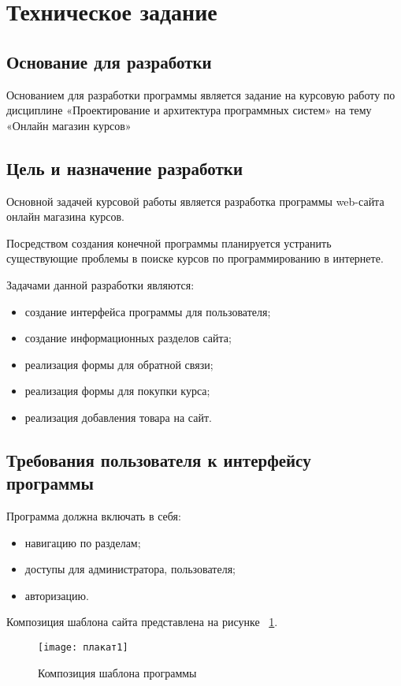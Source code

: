 \section{Техническое задание}
\subsection{Основание для разработки}

Основанием для разработки программы является задание на курсовую работу по дисциплине «Проектирование и архитектура программных систем» на тему «Онлайн магазин курсов»

\subsection{Цель и назначение разработки}

Основной задачей курсовой работы является разработка программы web-сайта онлайн магазина курсов.

Посредством создания конечной программы планируется устранить существующие проблемы в поиске курсов по программированию в интернете.

Задачами данной разработки являются:
\begin{itemize}
	\item создание интерфейса программы для пользователя;
	\item создание информационных разделов сайта;
	\item реализация формы для обратной связи;
	\item реализация формы для покупки курса;
	\item реализация добавления товара на сайт.
\end{itemize}

\subsection{Требования пользователя к интерфейсу программы}

Программа должна включать в себя:
\begin{itemize}
	\item навигацию по разделам;
	\item доступы для администратора, пользователя;
	\item авторизацию.
\end{itemize}

Композиция шаблона сайта представлена на рисунке ~\ref{плакат1:image}.

\begin{figure}[ht]
	\texttt{[image: плакат1]}
	\caption{Композиция шаблона программы}
	\label{плакат1:image}
\end{figure}

